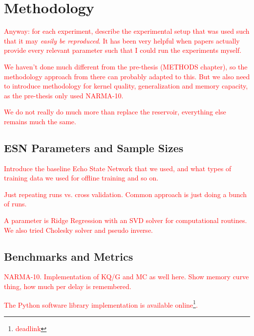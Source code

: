 \chapter{Methodology}

\textcolor{red}{
  Anyway: for each experiment, describe the experimental setup that was used
such that it may \textit{easily be reproduced}. It has been very helpful when
papers actually provide every relevant parameter such that I could run the
experiments myself.
}

\textcolor{red}{
  We haven't done much different from the pre-thesis (METHODS chapter), so the
methodology approach from there can probably adapted to this. But we also need
to introduce methodology for kernel quality, generalization and memory capacity,
as the pre-thesis only used NARMA-10.
}

\textcolor{red}{
  We do not really do much more than replace the reservoir, everything else
remains much the same.
}

\section{ESN Parameters and Sample Sizes}

\textcolor{red}{
  Introduce the baseline Echo State Network that we used, and what types of
training data we used for offline training and so on.
}

\textcolor{red}{
  Just repeating runs vs. cross validation. Common approach is just doing a
bunch of runs.
}

\textcolor{red}{
  A parameter is Ridge Regression with an SVD solver for computational
routines. We also tried Cholesky solver and pseudo inverse.
}

\section{Benchmarks and Metrics}

\textcolor{red}{
  NARMA-10. Implementation of KQ/G and MC as well here. Show memory curve thing,
how much per delay is remembered.
}

\textcolor{red}{
  The Python software library implementation is available
online\footnote{\textcolor{red}{deadlink}}.
}

